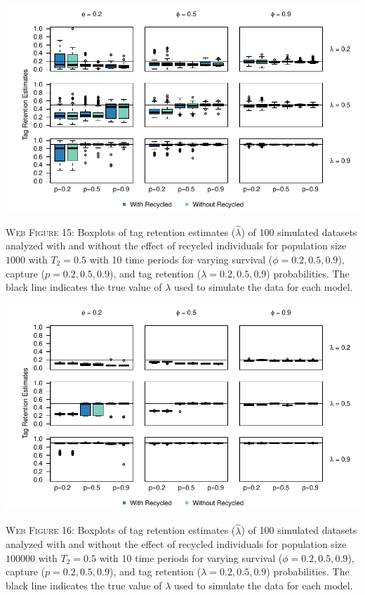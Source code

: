 \documentclass[]{article}
\begin{document}
\newpage

\includegraphics{Appendix_files/figure-latex/15_tagretention_GJSTL4-1.pdf}

\textsc{Web Figure 15:} Boxplots of tag retention estimates
(\(\hat{\lambda}\)) of 100 simulated datasets analyzed with and without
the effect of recycled individuals for population size \(1000\) with
\(T_2=0.5\) with 10 time periods for varying survival
(\(\phi=0.2,0.5,0.9\)), capture (\(p=0.2,0.5,0.9\)), and tag retention
(\(\lambda=0.2,0.5,0.9\)) probabilities. The black line indicates the
true value of \(\lambda\) used to simulate the data for each model.

\includegraphics{Appendix_files/figure-latex/16_tagretention_GJSTL3-1.pdf}

\textsc{Web Figure 16:} Boxplots of tag retention estimates
(\(\hat{\lambda}\)) of 100 simulated datasets analyzed with and without
the effect of recycled individuals for population size \(100000\) with
\(T_2=0.5\) with 10 time periods for varying survival
(\(\phi=0.2,0.5,0.9\)), capture (\(p=0.2,0.5,0.9\)), and tag retention
(\(\lambda=0.2,0.5,0.9\)) probabilities. The black line indicates the
true value of \(\lambda\) used to simulate the data for each model.
\end{document}
